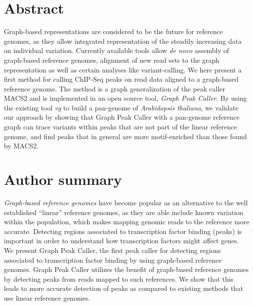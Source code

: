 \documentclass[10pt,letterpaper]{article}
\begin{document}
\section*{Abstract}

Graph-based representations are considered to be the future for reference genomes, as they allow integrated representation of the steadily increasing data on individual variation. Currently available tools allow \emph{de novo} assembly of  graph-based reference genomes, alignment of new read sets to the graph representation as well as certain analyses like variant-calling. We here present a first method for calling ChIP-Seq peaks on read data aligned to a graph-based reference genome. The method is a graph generalization of the peak caller MACS2 and is implemented in an open source tool, \emph{Graph Peak Caller}. By using the existing tool \emph{vg} to build a pan-genome of \emph{Arabidopsis thaliana}, we validate our approach by showing that Graph Peak Caller with a pan-genome reference graph can trace variants within peaks that are not part of the linear reference genome, and find peaks that in general are more motif-enriched than those found by MACS2. 


\section*{Author summary}
\emph{Graph-based reference genomes} have become popular as an alternative to the well established “linear” reference genomes, as they are able include known variation within the population, which makes mapping genomic reads to the reference more accurate. Detecting regions associated to transcription factor binding (peaks) is important in order to understand how transcription factors might affect genes. We present Graph Peak Caller, the first peak caller for detecting regions associated to transcription factor binding by using graph-based reference genomes. Graph Peak Caller utilizes the benefit of graph-based reference genomes by detecting peaks from reads mapped to such references. We show that this leads to more accurate detection of peaks as compared to existing methods that use linear reference genomes.



\end{document}
